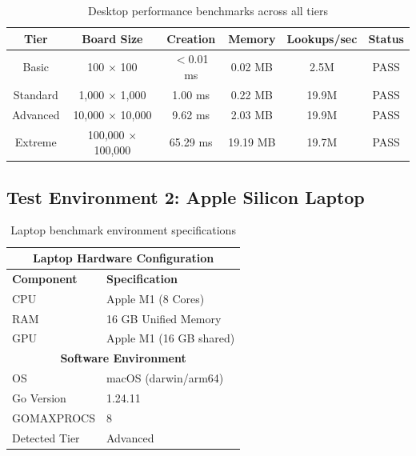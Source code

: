 \documentclass[11pt]{article}
\begin{document}
\begin{table}[H]
\centering
\renewcommand{\arraystretch}{1.4}
\begin{tabular}{|c|c|c|c|c|c|}
\hline
\rowcolor{codebg}
\textbf{Tier} & \textbf{Board Size} & \textbf{Creation} & \textbf{Memory} & \textbf{Lookups/sec} & \textbf{Status} \\
\hline
\cellcolor{green!20}Basic & 100 $\times$ 100 & $<$0.01 ms & 0.02 MB & 2.5M & \textcolor{green!60!black}{PASS} \\
\hline
\cellcolor{blue!20}Standard & 1,000 $\times$ 1,000 & 1.00 ms & 0.22 MB & 19.9M & \textcolor{green!60!black}{PASS} \\
\hline
\cellcolor{orange!20}Advanced & 10,000 $\times$ 10,000 & 9.62 ms & 2.03 MB & 19.9M & \textcolor{green!60!black}{PASS} \\
\hline
\cellcolor{red!20}Extreme & 100,000 $\times$ 100,000 & 65.29 ms & 19.19 MB & 19.7M & \textcolor{green!60!black}{PASS} \\
\hline
\end{tabular}
\caption{Desktop performance benchmarks across all tiers}
\label{tab:benchmarks-desktop}
\end{table}

\subsection{Test Environment 2: Apple Silicon Laptop}

\begin{table}[H]
\centering
\renewcommand{\arraystretch}{1.3}
\begin{tabular}{|l|l|}
\hline
\multicolumn{2}{|c|}{\textbf{Laptop Hardware Configuration}} \\
\hline
\textbf{Component} & \textbf{Specification} \\
\hline
CPU & Apple M1 (8 Cores) \\
RAM & 16 GB Unified Memory \\
GPU & Apple M1 (16 GB shared) \\
\hline
\multicolumn{2}{|c|}{\textbf{Software Environment}} \\
\hline
OS & macOS (darwin/arm64) \\
Go Version & 1.24.11 \\
GOMAXPROCS & 8 \\
Detected Tier & Advanced \\
\hline
\end{tabular}
\caption{Laptop benchmark environment specifications}
\label{tab:testenv-laptop}
\end{table}
\end{document}
